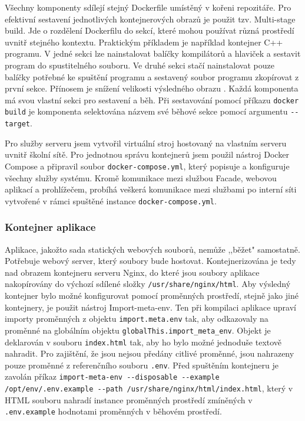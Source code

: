 Všechny komponenty sdílejí stejný Dockerfile umístěný v kořeni repozitáře. Pro efektivní sestavení jednotlivých kontejnerových obrazů je použit tzv. Multi-stage build. Jde o rozdělení Dockerfilu do sekcí, které mohou používat různá prostředí uvnitř stejného kontextu. Praktickým příkladem je například kontejner C++ programu. V jedné sekci lze nainstalovat balíčky kompilátorů a hlaviček a sestavit program do spustitelného souboru. Ve druhé sekci stačí nainstalovat pouze balíčky potřebné ke spuštění programu a sestavený soubor programu zkopírovat z první sekce. Přínosem je snížení velikosti výsledného obrazu \cite{MultistageBuilds0100}. Každá komponenta má svou vlastní sekci pro sestavení a běh. Při sestavování pomocí příkazu \lstinline|docker build| je komponenta selektována názvem své běhové sekce pomocí argumentu \lstinline|--target|.

Pro služby serveru jsem vytvořil virtuální stroj hostovaný na vlastním serveru uvnitř školní sítě. Pro jednotnou správu kontejnerů jsem použil nástroj Docker Compose a připravil soubor \lstinline|docker-compose.yml|, který popisuje a konfiguruje všechny služby systému. Kromě komunikace mezi službou Facade, webovou aplikací a prohlížečem, probíhá veškerá komunikace mezi službami po interní síti vytvořené v rámci spuštěné instance \lstinline|docker-compose.yml|. 

\subsubsection{Kontejner aplikace}
Aplikace, jakožto sada statických webových souborů, nemůže ,,běžet" samostatně. Potřebuje webový server, který soubory bude hostovat. Kontejnerizována je tedy nad obrazem kontejneru serveru Nginx, do které jsou soubory aplikace nakopírovány do výchozí sdílené složky \lstinline|/usr/share/nginx/html|. Aby výsledný kontejner bylo možné konfigurovat pomocí proměnných prostředí, stejně jako jiné kontejnery, je použit nástroj Import-meta-env. Ten při kompilaci aplikace upraví importy proměnných z objektu \lstinline|import.meta.env| tak, aby odkazovaly na proměnné na globálním objektu \lstinline|globalThis.import_meta_env|. Objekt je deklarován v souboru \lstinline|index.html| tak, aby ho bylo možné jednoduše textově nahradit. Pro zajištění, že jsou nejsou předány citlivé proměnné, jsou nahrazeny pouze proměnné z referenčního souboru \lstinline|.env|. Před spuštěním kontejneru je zavolán příkaz \lstinline|import-meta-env --disposable --example /opt/env/.env.example --path /usr/share/nginx/html/index.html|, který v HTML souboru nahradí instance proměnných prostředí zmíněných v \lstinline|.env.example| hodnotami proměnných v běhovém prostředí.

